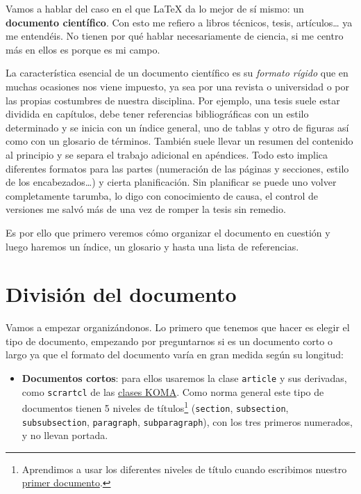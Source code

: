 Vamos a hablar del caso en el que LaTeX da lo mejor de sí mismo: un
\textbf{documento científico}. Con esto me refiero a libros técnicos,
tesis, artículos\ldots{} ya me entendéis. No tienen por qué hablar
necesariamente de ciencia, si me centro más en ellos es porque es mi
campo.

La característica esencial de un documento científico es su
\emph{formato rígido} que en muchas ocasiones nos viene impuesto, ya sea
por una revista o universidad o por las propias costumbres de nuestra
disciplina. Por ejemplo, una tesis suele estar dividida en capítulos,
debe tener referencias bibliográficas con un estilo determinado y se
inicia con un índice general, uno de tablas y otro de figuras así como
con un glosario de términos. También suele llevar un resumen del
contenido al principio y se separa el trabajo adicional en apéndices.
Todo esto implica diferentes formatos para las partes (numeración de las
páginas y secciones, estilo de los encabezados\ldots{}) y cierta
planificación. Sin planificar se puede uno volver completamente tarumba,
lo digo con conocimiento de causa, el control de versiones me salvó más de
una vez de romper la tesis sin remedio.

Es por ello que primero veremos cómo organizar el documento en cuestión
y luego haremos un índice, un glosario y hasta una lista de
referencias.

\section{División del documento}

Vamos a empezar organizándonos. Lo primero que tenemos que hacer es
elegir el tipo de documento, empezando por preguntarnos si es un
documento corto o largo ya que el formato del documento varía en gran
medida según su longitud:

\begin{itemize}
\item
  \textbf{Documentos cortos}: para ellos usaremos la clase
  \lstinline!article! y sus derivadas, como \lstinline!scrartcl! de las
  \href{https://www.ctan.org/pkg/koma-script}{clases KOMA}. Como norma
  general este tipo de documentos tienen 5 niveles de títulos\footnote{Aprendimos
    a usar los diferentes niveles de título cuando escribimos nuestro
    \href{https://ondiz.github.io/cursoLatex/Contenido/03.DocumentoBasico.html}{primer
    documento}.} (\lstinline!section!, \lstinline!subsection!,
  \lstinline!subsubsection!, \lstinline!paragraph!,
  \lstinline!subparagraph!), con los tres primeros numerados, y no
  llevan portada.
\end{itemize}

